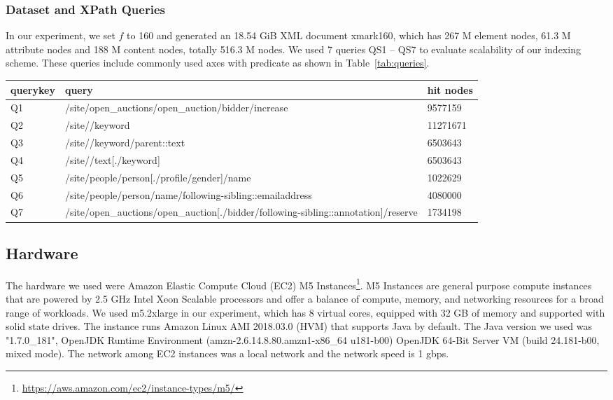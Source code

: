 \subsubsection{Dataset and XPath Queries} 

In our experiment, we set $f$ to 160 and generated an 18.54 GiB XML document
xmark160, which has 267 M element nodes, 61.3 M attribute nodes and 188 M
content nodes, totally 516.3 M nodes. We used 7 queries QS1 -- QS7 to evaluate
scalability of our indexing scheme. These queries include commonly used axes
with predicate as shown in Table~\ref{tab:queries}.


\begin{table*}[ht]
	\centering
	\caption{Queries used for xmark160 dataset.}
	\label{tab:queries}
	\begin{tabular}{|l|l|l|}
		\hline
		querykey & query                                                                                  & hit nodes \\ \hline
		Q1       & /site/open\_auctions/open\_auction/bidder/increase                                     & 9577159   \\ \hline
		Q2       & /site//keyword                                                                         & 11271671  \\ \hline
		Q3       & /site//keyword/parent::text                                                            & 6503643   \\ \hline
		Q4       & /site//text{[}./keyword{]}                                                             & 6503643   \\ \hline
		Q5       & /site/people/person{[}./profile/gender{]}/name                                         & 1022629   \\ \hline
		Q6       & /site/people/person/name/following-sibling::emailaddress                               & 4080000   \\ \hline
		Q7       & /site/open\_auctions/open\_auction{[}./bidder/following-sibling::annotation{]}/reserve & 1734198   \\ \hline
	\end{tabular}
\end{table*}


\subsection{Hardware} 

The hardware we used were Amazon Elastic Compute Cloud (EC2) M5
Instances\footnote{\url{https://aws.amazon.com/ec2/instance-types/m5/}}. M5
Instances are general purpose compute instances that are powered by 2.5 GHz
Intel Xeon Scalable processors and offer a balance of compute, memory, and
networking resources for a broad range of workloads.  We used m5.2xlarge in our
experiment, which has 8 virtual cores, equipped with 32 GB of memory and
supported with solid state drives.  The instance runs Amazon Linux AMI 2018.03.0
(HVM) that supports Java by default. The Java version we used was "1.7.0\_181",
OpenJDK Runtime Environment (amzn-2.6.14.8.80.amzn1-x86\_64 u181-b00) OpenJDK
64-Bit Server VM (build 24.181-b00, mixed mode). The network among EC2 instances
was a local network and the network speed is 1 gbps.


